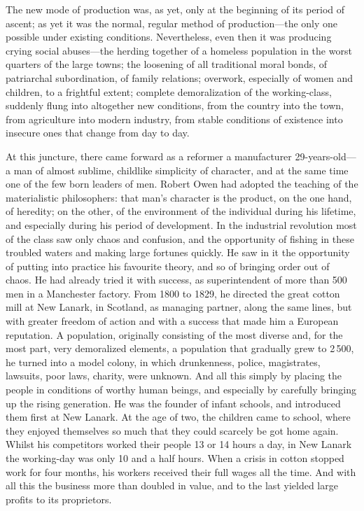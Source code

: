 The new mode of production was, as yet, only at the beginning of its period of
ascent; as yet it was the normal, regular method of production---the only one
possible under existing conditions. Nevertheless, even then it was producing
crying social abuses---the herding together of a homeless population in the
worst quarters of the large towns; the loosening of all traditional moral bonds,
of patriarchal subordination, of family relations; overwork, especially of women
and children, to a frightful extent; complete demoralization of the
working-class, suddenly flung into altogether new conditions, from the country
into the town, from agriculture into modern industry, from stable conditions of
existence into insecure ones that change from day to day.

At this juncture, there came forward as a reformer a manufacturer
29-years-old---a man of almost sublime, childlike simplicity of character, and
at the same time one of the few born leaders of men. Robert Owen had adopted the
teaching of the materialistic philosophers: that man's character is the product,
on the one hand, of heredity; on the other, of the environment of the individual
during his lifetime, and especially during his period of development. In the
industrial revolution most of the class saw only chaos and confusion, and the
opportunity of fishing in these troubled waters and making large fortunes
quickly. He saw in it the opportunity of putting into practice his favourite
theory, and so of bringing order out of chaos. He had already tried it with
success, as superintendent of more than 500 men in a Manchester factory. From
1800 to 1829, he directed the great cotton mill at New Lanark, in Scotland, as
managing partner, along the same lines, but with greater freedom of action and
with a success that made him a European reputation. A population, originally
consisting of the most diverse and, for the most part, very demoralized
elements, a population that gradually grew to 2\,500, he turned into a model
colony, in which drunkenness, police, magistrates, lawsuits, poor laws, charity,
were unknown. And all this simply by placing the people in conditions of worthy
human beings, and especially by carefully bringing up the rising generation. He
was the founder of infant schools, and introduced them first at New Lanark. At
the age of two, the children came to school, where they enjoyed themselves so
much that they could scarcely be got home again. Whilst his competitors worked
their people 13 or 14 hours a day, in New Lanark the working-day was only 10 and
a half hours. When a crisis in cotton stopped work for four months, his workers
received their full wages all the time. And with all this the business more than
doubled in value, and to the last yielded large profits to its proprietors.

